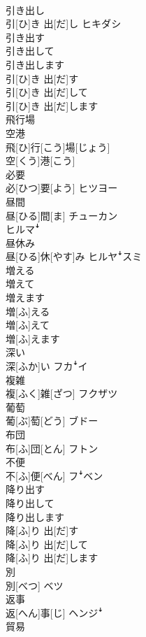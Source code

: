 \documentclass[8pt]{extreport}
\begin{document}
\begin{CJK}{UTF8}{min}
\\	引き出し	
\\	引[ひ]き 出[だ]し	ヒキダシ
\\	引き出す 
\\	引き出して 
\\	引き出します	
\\	引[ひ]き 出[だ]す 
\\	引[ひ]き 出[だ]して 
\\	引[ひ]き 出[だ]します	
\\	飛行場 
\\	空港	
\\	飛[ひ]行[こう]場[じょう] 
\\	空[くう]港[こう]	
\\	必要	
\\	必[ひつ]要[よう]	ヒツヨー
\\	昼間	
\\	昼[ひる]間[ま]	チューカン 
\\	ヒルマꜜ
\\	昼休み	
\\	昼[ひる]休[やす]み	ヒルヤꜜスミ
\\	増える 
\\	増えて 
\\	増えます	
\\	増[ふ]える 
\\	増[ふ]えて 
\\	増[ふ]えます	
\\	深い	
\\	深[ふか]い	フカꜜイ
\\	複雑	
\\	複[ふく]雑[ざつ]	フクザツ
\\	葡萄	
\\	葡[ぶ]萄[どう]	ブドー
\\	布団	
\\	布[ふ]団[とん]	フトン
\\	不便	
\\	不[ふ]便[べん]	フꜜベン
\\	降り出す 
\\	降り出して 
\\	降り出します	
\\	降[ふ]り 出[だ]す 
\\	降[ふ]り 出[だ]して 
\\	降[ふ]り 出[だ]します	
\\	別	
\\	別[べつ]	ベツ
\\	返事	
\\	返[へん]事[じ]	ヘンジꜜ
\\	貿易	

\end{CJK}
\end{document}
